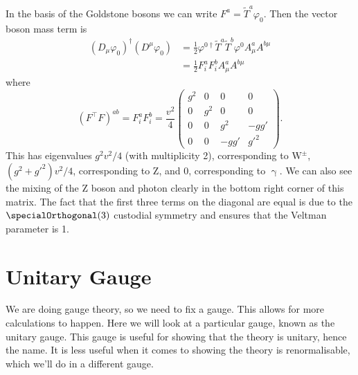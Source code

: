 \documentclass[fleqn]{NotesClass}
\newcommand{\Pparticle}[1]{\mathrm{#1}}
\newcommand{\Pphoton}{\ensuremath{\upgamma}}
\newcommand{\PZ}{\ensuremath{\Pparticle{Z}}}
\newcommand{\PW}{\ensuremath{\Pparticle{W}}}
\newcommand{\covariantDerivative}{D}
\newcommand{\hermit}{\dagger}
\newcommand{\trans}{\top}
\begin{document}
    In the basis of the Goldstone bosons we can write \(F^a = \tilde{T}^a \varphi_0\).
    Then the vector boson mass term is
    \begin{align}
        (\covariantDerivative_\mu \varphi_0)^\hermit (\covariantDerivative^\mu \varphi_0) &= \frac{1}{2}\varphi^{0\hermit} \tilde{T}^a\tilde{T}^b \varphi^0 A^a_\mu A^{b\mu}\\
        &= \frac{1}{2}F^a_iF^b_i A^a_\mu A^{b\mu}
    \end{align}
    where
    \begin{equation}
        (F^\trans F)^{ab} = F^a_i F^b_i = \frac{v^2}{4}
        \begin{pmatrix}
            g^2 & 0 & 0 & 0\\
            0 & g^2 & 0 & 0\\
            0 & 0 & g^2 & -gg'\\
            0 & 0 & -gg' & g'^2
        \end{pmatrix}
        .
    \end{equation}
    This has eigenvalues \(g^2v^2/4\) (with multiplicity 2), corresponding to \(\PW^{\pm}\), \((g^2 + g'^2)v^2/4\), corresponding to \(\PZ\), and 0, corresponding to \(\Pphoton\).
    We can also see the mixing of the \PZ{} boson and photon clearly in the bottom right corner of this matrix.
    The fact that the first three terms on the diagonal are equal is due to the \(\specialOrthogonal(3)\) custodial symmetry and ensures that the Veltman parameter is 1.
    
    \section{Unitary Gauge}
    We are doing gauge theory, so we need to fix a gauge.
    This allows for more calculations to happen.
    Here we will look at a particular gauge, known as the unitary gauge.
    This gauge is useful for showing that the theory is unitary, hence the name.
    It is less useful when it comes to showing the theory is renormalisable, which we'll do in a different gauge.
    
\end{document}
